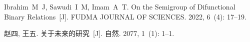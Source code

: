 
\begin{thebibliography}{99}


Ibrahim~M~J, Sawudi~I~M, Imam~A~T.
On the Semigroup of Difunctional Binary Relations~[J].
FUDMA JOURNAL OF SCIENCES.
2022, 6~(4):  17--19.

赵四, 王五.
关于未来的研究~[J].
自然.
2077, 1~(1):  1--1.

\end{thebibliography}


